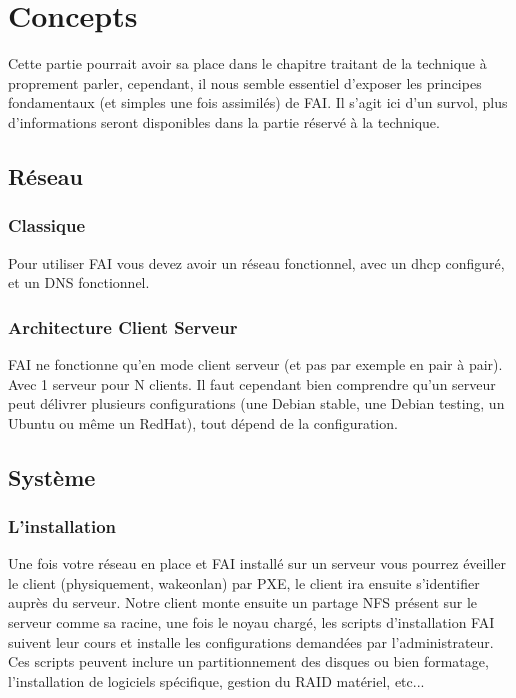 \documentclass[a4paper,12pt,one side,titlepage]{report}
\begin{document}
\section{Concepts}
Cette partie pourrait avoir sa place dans le chapitre traitant de la technique à proprement parler, cependant, il nous semble essentiel d'exposer les principes fondamentaux (et simples une fois assimilés) de \textsc{FAI}. Il s'agit ici d'un survol, plus d'informations seront disponibles dans la partie réservé à la technique.


\subsection{Réseau}

\subsubsection{Classique}
Pour utiliser \textsc{FAI} vous devez avoir un réseau fonctionnel, avec un dhcp configuré, et un DNS fonctionnel.

\subsubsection{Architecture Client Serveur}
\textsc{FAI} ne fonctionne qu'en mode client serveur (et pas par exemple en pair à pair). Avec 1 serveur pour N clients. Il faut cependant bien comprendre qu'un serveur peut délivrer plusieurs configurations (une Debian stable, une Debian testing, un Ubuntu ou même un RedHat), tout dépend de la configuration.

\subsection{Système}

\subsubsection{L'installation}
Une fois votre réseau en place et \textsc{FAI} installé sur un serveur vous pourrez éveiller le client (physiquement, wakeonlan) par PXE, le client ira ensuite s'identifier auprès du serveur. Notre client monte ensuite un partage NFS présent sur le serveur comme sa racine, une fois le noyau chargé, les scripts  d'installation FAI suivent leur cours et installe les configurations demandées par l'administrateur. Ces scripts peuvent inclure un partitionnement des disques ou bien formatage, l'installation de logiciels spécifique, gestion du RAID matériel, etc...
\end{document}
